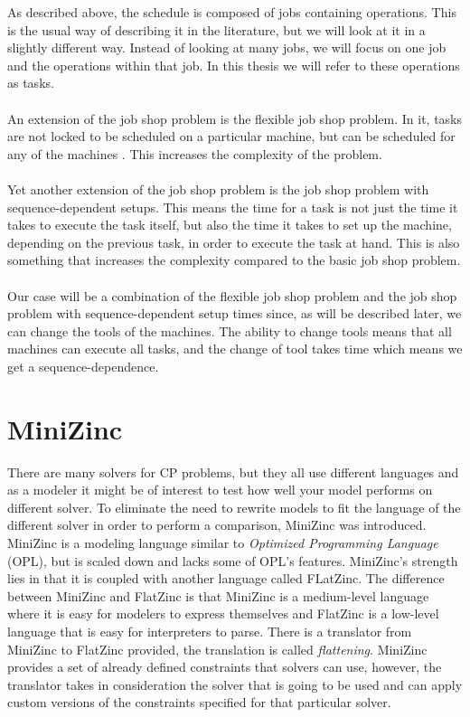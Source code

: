 As described above, the schedule is composed of jobs containing operations. This is the usual way of describing it in the literature, but we will look at it in a slightly different way. Instead of looking at many jobs, we will focus on one job and the operations within that job. In this thesis we will refer to these operations as tasks.
\\\\
An extension of the job shop problem is the flexible job shop problem. In it, tasks are not locked to be scheduled on a particular machine, but can be scheduled for any of the machines \cite{thornblad_2013}. This increases the complexity of the problem.
\\\\
Yet another extension of the job shop problem is the job shop problem with sequence-dependent setups. This means the time for a task is not just the time it takes to execute the task itself, but also the time it takes to set up the machine, depending on the previous task, in order to execute the task at hand. This is also something that increases the complexity compared to the basic job shop problem.
\\\\
Our case will be a combination of the flexible job shop problem and the job shop problem with sequence-dependent setup times since, as will be described later, we can change the tools of the machines. The ability to change tools means that all machines can execute all tasks, and the change of tool takes time which means we get a sequence-dependence.

\section{MiniZinc}
There are many solvers for CP problems, but they all use different languages and as a modeler it might be of interest to test how well your model performs on different solver. To eliminate the need to rewrite models to fit the language of the different solver in order to perform a comparison, MiniZinc was introduced. MiniZinc is a modeling language similar to \emph{Optimized Programming Language} (OPL), but is scaled down and lacks some of OPL's features. MiniZinc's strength lies in that it is coupled with another language called FLatZinc. The difference between MiniZinc and FlatZinc is that MiniZinc is a medium-level language where it is easy for modelers to express themselves and FlatZinc is a low-level language that is easy for interpreters to parse. There is a translator from MiniZinc to FlatZinc provided, the translation is called \emph{flattening}. MiniZinc provides a set of already defined constraints that solvers can use, however, the translator takes in consideration the solver that is going to be used and can apply custom versions of the constraints specified for that particular solver.
\cite{mz_paper}

